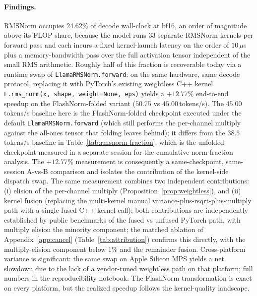 \documentclass{article}
\begin{document}
\paragraph{Findings.} RMSNorm occupies 24.62\% of decode wall-clock at bf16, an order of magnitude above its FLOP share, because the model runs 33 separate RMSNorm kernels per forward pass and each incurs a fixed kernel-launch latency on the order of $10\,\mu$s plus a memory-bandwidth pass over the full activation tensor independent of the small RMS arithmetic. Roughly half of this fraction is recoverable today via a runtime swap of \texttt{LlamaRMSNorm.forward}: on the same hardware, same decode protocol, replacing it with PyTorch's existing weightless C++ kernel \texttt{F.rms\_norm(x, shape, weight=None, eps)} yields a $\mathbf{+12.77\%}$ end-to-end speedup on the FlashNorm-folded variant
($50.75$ vs $45.00$\,tokens/s).
The $45.00$\,tokens/s baseline here is the FlashNorm-folded checkpoint executed under the default \texttt{LlamaRMSNorm.forward} (which still performs the per-channel multiply against the all-ones tensor that folding leaves behind); it differs from the $38.5$\,tokens/s baseline in Table~\ref{tab:rmsnorm-fraction}, which is the unfolded checkpoint measured in a separate session for the cumulative-norm-fraction analysis. The $+12.77\%$ measurement is consequently a same-checkpoint, same-session A-vs-B comparison and isolates the contribution of the kernel-side dispatch swap. The same measurement combines two independent contributions: (i) elision of the per-channel multiply (Proposition~\ref{prop:weightless}), and (ii) kernel fusion (replacing the multi-kernel manual variance-plus-rsqrt-plus-multiply path with a single fused C++ kernel call); both contributions are independently established by public benchmarks of the fused vs unfused PyTorch path, with multiply elision the minority component; the matched ablation of Appendix~\ref{app:cancel} (Table~\ref{tab:attribution}) confirms this directly, with the multiply-elision component below 1\% and the remainder fusion. Cross-platform variance is significant: the same swap on Apple Silicon MPS yields a net slowdown due to the lack of a vendor-tuned weightless path on that platform; full numbers in the reproducibility notebook. The FlashNorm transformation is exact on every platform, but the realized speedup follows the kernel-quality landscape.
\end{document}
